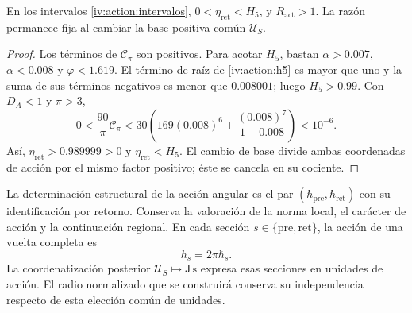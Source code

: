 \begin{proposition}
\label{iv:action:positividad}
En los intervalos \eqref{iv:action:intervalos},
\(0<\eta_{\mathrm{ret}}<H_5\), y \(R_{\mathrm{act}}>1\).
La razón permanece fija al cambiar la base positiva común
\(\mathcal U_S\).
\end{proposition}
\begin{proof}
Los términos de \(\mathcal C_\pi\) son positivos. Para acotar
\(H_5\), bastan \(\alpha>0.007\), \(\alpha<0.008\) y
\(\varphi<1.619\). El término de raíz de \eqref{iv:action:h5}
es mayor que uno y la suma de sus términos negativos es menor
que \(0.008001\); luego \(H_5>0.99\).
Con \(D_A<1\) y \(\pi>3\),
\[
 0<\frac{90}{\pi}\mathcal C_\pi
 <30\left(169(0.008)^6+
             \frac{(0.008)^7}{1-0.008}\right)<10^{-6}.
\]
Así, \(\eta_{\mathrm{ret}}>0.989999>0\) y
\(\eta_{\mathrm{ret}}<H_5\). El cambio de base divide ambas
coordenadas de acción por el mismo factor positivo; éste se
cancela en su cociente.
\end{proof}

La determinación estructural de la acción angular es el par
\((\hbar_{\mathrm{pre}},\hbar_{\mathrm{ret}})\) con su
identificación por retorno. Conserva la valoración de la norma
local, el carácter de acción y la continuación regional.
En cada sección \(s\in\{\mathrm{pre},\mathrm{ret}\}\), la acción
de una vuelta completa es
\begin{equation}
 h_s=2\pi\hbar_s.
 \label{iv:action:vuelta}
\end{equation}
La coordenatización posterior \(\mathcal U_S\mapsto\mathrm{J\,s}\) expresa
esas secciones en unidades de acción. El radio normalizado que
se construirá conserva su independencia respecto de esta elección
común de unidades.
